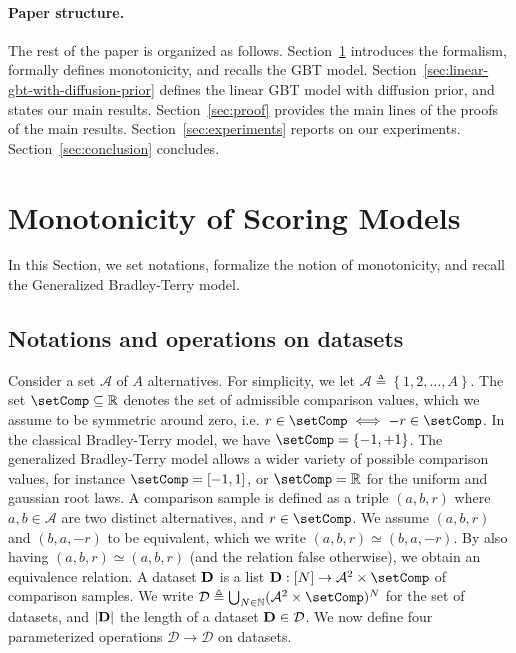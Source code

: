 \documentclass{article}
\newcommand{\set}[1]{\left\lbrace #1 \right\rbrace}
\newcommand{\card}[1]{\left\lvert{#1}\right\rvert}
\newcommand{\setN}{\mathbb N}
\newcommand{\cA}{\mathcal A}
\newcommand{\cD}{\mathcal D}
\newcommand{\bD}{{\bf D}}
\newcommand{\bbR}{\mathbb R}
\begin{document}
\paragraph{Paper structure.}
The rest of the paper is organized as follows.
Section~\ref{sec:monotonicity-formal-definition} introduces the formalism, formally defines monotonicity, and recalls the GBT model.
Section~\ref{sec:linear-gbt-with-diffusion-prior} defines the linear GBT model with diffusion prior,
and states our main results.
Section~\ref{sec:proof} provides the main lines of the proofs of the main results.
Section~\ref{sec:experiments} reports on our experiments.
Section~\ref{sec:conclusion} concludes.





\section{Monotonicity of Scoring Models}
\label{sec:monotonicity-formal-definition}

In this Section, we set notations, formalize the notion of monotonicity, and recall the Generalized Bradley-Terry model.

\subsection{Notations and operations on datasets}
\label{subsec:dataset-type}


Consider a set $\cA$ of $A$ alternatives. For simplicity, we let $\cA \triangleq \set{1, 2, \ldots, A}$.
The set $\setComp \subseteq \mathbb{R}$  denotes the set of admissible comparison values,
which we assume to be symmetric around zero, i.e. $r \in \setComp \iff -r \in \setComp$.
In the classical Bradley-Terry model, we have $\setComp = \set{-1, +1}$.
The generalized Bradley-Terry model allows a wider variety of possible comparison values, for instance $\setComp = [-1, 1]$, or $\setComp = \bbR$ for the uniform and gaussian root laws.
A comparison sample is defined as a triple $(a,b,r)$
where $a,b \in \cA$ are two distinct alternatives, and $r \in \setComp$.
We assume $(a, b, r)$ and $(b, a, -r)$ to be equivalent,
which we write $(a, b, r) \simeq (b, a, -r)$.
By also having $(a, b, r) \simeq (a, b, r)$ (and the relation false otherwise),
we obtain an equivalence relation.
A dataset $\bD$ is a list $\bD : [N] \to \cA^2 \times \setComp$ of comparison samples.
We write $\cD \triangleq \bigcup_{N \in \setN} (\cA^2 \times \setComp)^N$ for the set of datasets,
and $\card{\bD}$ the length of a dataset $\bD \in \cD$.
We now define four parameterized operations $\cD \to \cD$ on datasets.
\end{document}
